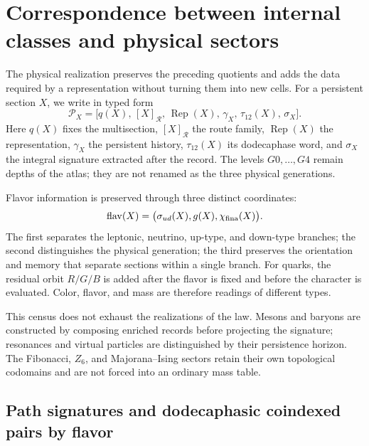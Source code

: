\chapter[Correspondence with physical sectors]{Correspondence between internal classes and physical sectors}
\label{sec:censo-fisico-atlas-rev7}

The physical realization preserves the preceding quotients and adds the data
required by a representation without turning them into new cells. For a
persistent section \(X\), we write in typed form
\[
 \mathcal P_X=
 \bigl[q(X),\,[X]_{\mathcal R},\,\operatorname{Rep}(X),\,
       \gamma_X,\,\tau_{12}(X),\,\sigma_X\bigr].
\]
Here \(q(X)\) fixes the multisection, \([X]_{\mathcal R}\) the route family,
\(\operatorname{Rep}(X)\) the representation, \(\gamma_X\) the persistent
history, \(\tau_{12}(X)\) its dodecaphase word, and \(\sigma_X\) the integral
signature extracted after the record. The levels \(G0,\ldots,G4\) remain
depths of the atlas; they are not renamed as the three physical
generations.

Flavor information is preserved through three distinct coordinates:
\[
 \operatorname{flav}(X)=
 \bigl(\sigma_{ud}(X),g(X),\chi_{\rm fina}(X)\bigr).
\]
The first separates the leptonic, neutrino, up-type, and down-type branches; the second distinguishes the physical generation; the third preserves the orientation and memory that separate sections within a single branch. For quarks, the residual orbit \(R/G/B\) is added after the flavor is fixed and before the character is evaluated. Color, flavor, and mass are therefore readings of different types.


This census does not exhaust the realizations of the law. Mesons and baryons are
constructed by composing enriched records before projecting the signature;
resonances and virtual particles are distinguished by their persistence
horizon. The Fibonacci, \(Z_6\), and Majorana--Ising sectors retain
their own topological codomains and are not forced into an ordinary mass
table.

\section{Path signatures and dodecaphasic coindexed pairs by flavor}

